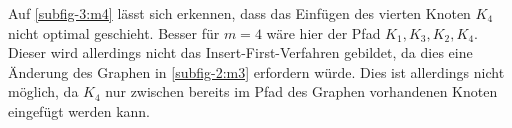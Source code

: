   Auf \vref{subfig-3:m4} lässt sich erkennen, dass das Einfügen des vierten Knoten $K_4$ nicht optimal geschieht. Besser für $m = 4$ wäre hier der Pfad $K_1, K_3, K_2, K_4$. 
  Dieser wird allerdings nicht das Insert-First-Verfahren gebildet, da dies eine Änderung des Graphen in \vref{subfig-2:m3} erfordern würde. 
  Dies ist allerdings nicht möglich, da $K_4$ nur zwischen bereits im Pfad des Graphen vorhandenen Knoten eingefügt werden kann.